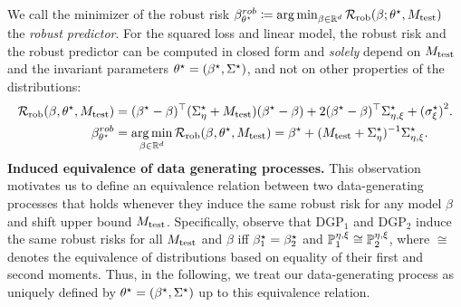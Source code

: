 We call the minimizer of the robust risk 
 $\beta^{rob}_{\theta^{\star}} \coloneqq \operatorname*{arg\,min}_{\beta \in \mathbb{R}^d} \mathcal{R}_{\mathrm{rob}}(\beta; \theta^{\star},M_{\mathrm{test}}) $ the \emph{robust predictor}.
%
 For the squared loss and linear model, the robust risk and the robust predictor can be computed in closed form and \emph{solely} depend on $M_{\mathrm{test}}$ and the invariant parameters $\theta^{\star} = (\beta^{\star},\Sigma^{\star})$, %
and not on other properties of the distributions:
\begin{align}\label{eqn:formula-robust-predictor}
\begin{split}
        \mathcal{R}_{\mathrm{rob}}(\beta, \theta^{\star}, M_{\mathrm{test}}) &=  (\beta^{\star} - \beta)^\top (\Sigma^\star_{\eta} + M_{\mathrm{test}})(\beta^{\star} - \beta) + 2(\beta^{\star}-\beta)^\top\Sigma^\star_{\eta,\xi} + {{(\sigma_\xi^\star)}^2}. 
        \\
        \beta^{rob}_{\theta^{\star}}  &= \operatorname*{arg\,min}_{\beta \in \mathbb{R}^d} \mathcal{R}_{\mathrm{rob}}(\beta, \theta^{\star}, M_{\mathrm{test}}) = \beta^{\star} + (M_{\mathrm{test}} + \Sigma^\star_{\eta})^{-1} \Sigma^\star_{\eta,\xi}.
\end{split}
\end{align}
\textbf{Induced equivalence of data generating processes.} This observation motivates us to define an equivalence relation between two data-generating processes that holds whenever they induce the same robust risk for any model $\beta$ and shift upper bound $M_{\mathrm{test}}$. Specifically, observe that $\mathrm{DGP}_1$ and $\mathrm{DGP}_2$ induce the same robust risks for all $M_{\mathrm{test}}$ and $\beta$ iff $\beta^{\star}_1 = \beta^{\star}_2$ and $\mathbb{P}^{\eta,\xi}_1 \cong \mathbb{P}^{\eta,\xi}_2$, where $\cong$ denotes the equivalence of distributions based on equality of their first and second moments. 
Thus, in the following, we treat our data-generating process as uniquely defined by $\theta^{\star} =(\beta^{\star}, \Sigma^{\star})$ up to this equivalence relation.

